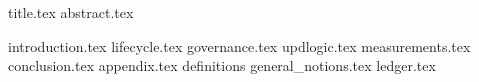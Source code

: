\documentclass{llncs}
\begin{document}
{title.tex}
{abstract.tex}

{introduction.tex}
{lifecycle.tex}
{governance.tex}
{updlogic.tex}
{measurements.tex}
{conclusion.tex}
{appendix.tex}
{definitions}
{general_notions.tex}
{ledger.tex}



\end{document}

